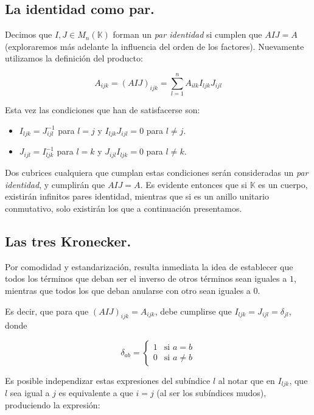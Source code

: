 \documentclass[a4paper, titlepage]{article}
\begin{document}
\subsection{La identidad como par.}

Decimos que $I, J \in M_{n} (\mathbb{K})$ forman un \textit{par identidad} si cumplen que $AIJ = A$ (exploraremos más adelante la influencia del orden de los factores). Nuevamente utilizamos la definición del producto:

$$A_{ijk} = (AIJ)_{ijk} = \sum\limits_{l=1}^{n} A_{ilk} I_{ljk} J_{ijl}$$

\newpage

Esta vez las condiciones que han de satisfacerse son:

\begin{itemize}
	\item $I_{ljk} = J_{ijl}^{-1}$ para $l = j$ y $I_{ljk} J_{ijl} = 0$ para $l \neq j$.
	\item $J_{ijl} = I_{ljk}^{-1}$ para $l = k$ y $J_{ijl} I_{ljk} = 0$ para $l \neq k$.
\end{itemize}

Dos cubrices cualquiera que cumplan estas condiciones serán consideradas un \textit{par identidad}, y cumplirán que $AIJ = A$. Es evidente entonces que si $\mathbb{K}$ es un cuerpo, existirán infinitos pares identidad, mientras que si es un anillo unitario conmutativo, solo existirán los que a continuación presentamos.

\subsection{Las tres Kronecker.}

Por comodidad y estandarización, resulta inmediata la idea de establecer que todos los términos que deban ser el inverso de otros términos sean iguales a $1$, mientras que todos los que deban anularse con otro sean iguales a $0$.

Es decir, que para que $(AIJ)_{ijk} = A_{ijk}$, debe cumplirse que $I_{ljk} = J_{ijl} = \delta_{jl}$, donde

\begin{equation}
	\delta_{ab} =
	\begin{cases}
		1 & \text{si } a = b \\
		0 & \text{si } a \neq b
	\end{cases}
\end{equation}

Es posible independizar estas expresiones del subíndice $l$ al notar que en $I_{ljk}$, que $l$ sea igual a $j$ es equivalente a que $i = j$ (al ser los subíndices mudos), produciendo la expresión:
\end{document}
